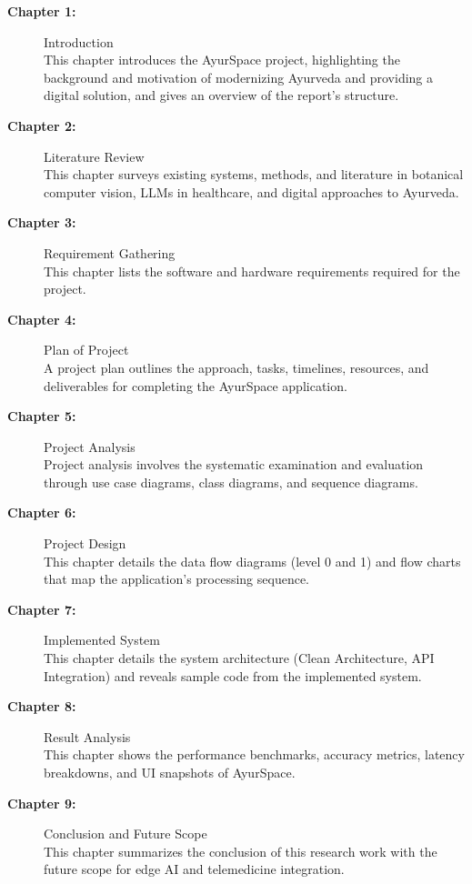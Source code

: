 \documentclass[12pt]{article}
\begin{document}
\begin{description}
    \item[\textbf{Chapter 1:}] Introduction\\
    This chapter introduces the AyurSpace project, highlighting the background and motivation of
    modernizing Ayurveda and providing a digital solution, and gives an overview of the report's
    structure.

    \item[\textbf{Chapter 2:}] Literature Review\\
    This chapter surveys existing systems, methods, and literature in botanical computer vision,
    LLMs in healthcare, and digital approaches to Ayurveda.

    \item[\textbf{Chapter 3:}] Requirement Gathering\\
    This chapter lists the software and hardware requirements required for the project.

    \item[\textbf{Chapter 4:}] Plan of Project\\
    A project plan outlines the approach, tasks, timelines, resources, and deliverables for
    completing the AyurSpace application.

    \item[\textbf{Chapter 5:}] Project Analysis\\
    Project analysis involves the systematic examination and evaluation through use case diagrams,
    class diagrams, and sequence diagrams.

    \item[\textbf{Chapter 6:}] Project Design\\
    This chapter details the data flow diagrams (level 0 and 1) and flow charts that map the
    application's processing sequence.

    \item[\textbf{Chapter 7:}] Implemented System\\
    This chapter details the system architecture (Clean Architecture, API Integration) and reveals
    sample code from the implemented system.

    \item[\textbf{Chapter 8:}] Result Analysis\\
    This chapter shows the performance benchmarks, accuracy metrics, latency breakdowns, and UI
    snapshots of AyurSpace.

    \item[\textbf{Chapter 9:}] Conclusion and Future Scope\\
    This chapter summarizes the conclusion of this research work with the future scope for edge AI
    and telemedicine integration.
\end{description}
\end{document}
